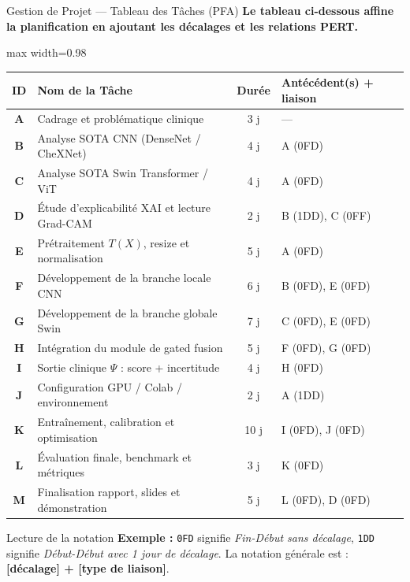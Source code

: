 \begin{frame}{Gestion de Projet --- Tableau des Tâches (PFA)}
    \textbf{Le tableau ci-dessous affine la planification en ajoutant les décalages et les relations PERT.}
    \centering
    \scriptsize
    \renewcommand{\arraystretch}{1.1}
    \begin{adjustbox}{max width=0.98\textwidth}
    \begin{tabular}{|c|p{5.6cm}|c|p{4.8cm}|}
        \hline
        \textbf{ID} & \textbf{Nom de la Tâche} & \textbf{Durée} & \textbf{Antécédent(s) + liaison} \\ \hline
        \textbf{A} & Cadrage et problématique clinique & 3 j & --- \\ \hline
        \textbf{B} & Analyse SOTA CNN (DenseNet / CheXNet) & 4 j & A (0FD) \\ \hline
        \textbf{C} & Analyse SOTA Swin Transformer / ViT & 4 j & A (0FD) \\ \hline
        \textbf{D} & Étude d'explicabilité XAI et lecture Grad-CAM & 2 j & B (1DD), C (0FF) \\ \hline
        \textbf{E} & Prétraitement $T(X)$, resize et normalisation & 5 j & A (0FD) \\ \hline
        \textbf{F} & Développement de la branche locale CNN & 6 j & B (0FD), E (0FD) \\ \hline
        \textbf{G} & Développement de la branche globale Swin & 7 j & C (0FD), E (0FD) \\ \hline
        \textbf{H} & Intégration du module de gated fusion & 5 j & F (0FD), G (0FD) \\ \hline
        \textbf{I} & Sortie clinique $\Psi$ : score + incertitude & 4 j & H (0FD) \\ \hline
        \textbf{J} & Configuration GPU / Colab / environnement & 2 j & A (1DD) \\ \hline
        \textbf{K} & Entraînement, calibration et optimisation & 10 j & I (0FD), J (0FD) \\ \hline
        \textbf{L} & Évaluation finale, benchmark et métriques & 3 j & K (0FD) \\ \hline
        \textbf{M} & Finalisation rapport, slides et démonstration & 5 j & L (0FD), D (0FD) \\ \hline
    \end{tabular}
    \end{adjustbox}
    \captionsetup{type=table}

    \vspace{0.15cm}
    \tiny
    \begin{block}{Lecture de la notation}
        \textbf{Exemple :} \texttt{0FD} signifie \emph{Fin-Début sans décalage}, \texttt{1DD} signifie \emph{Début-Début avec 1 jour de décalage}. 
        La notation générale est : \textbf{[décalage] + [type de liaison]}.
    \end{block}
\end{frame}

